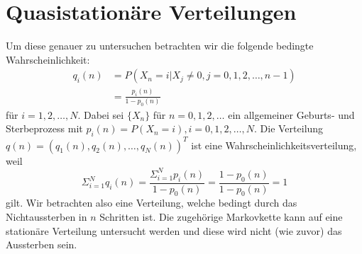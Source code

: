 \documentclass{article}
\begin{document}
\section{Quasistationäre Verteilungen}
Um diese genauer zu untersuchen betrachten wir die folgende bedingte Wahrscheinlichkeit:
\begin{align*}
  q_i(n) &= P(X_n=i|X_j \neq 0, j = 0,1,2,\dots,n-1) \\
         &= \frac{p_i(n)}{1-p_0(n)}
\end{align*}
für $i = 1,2,\dots, N$.
Dabei sei $\{X_n\}$ für $n = 0,1,2,\dots$  ein allgemeiner Geburts- und Sterbeprozess mit $p_i(n) = P(X_n = i), i = 0,1,2,\dots,N$. Die Verteilung $q(n) = (q_1(n), q_2(n), \dots, q_N(n))^T$ ist eine Wahrscheinlichkeitsverteilung, weil
\[
  Σ_{i=1}^N q_i(n) = \frac{Σ_{i=1}^Np_i(n)}{1-p_0(n)} = \frac{1-p_0(n)}{1-p_0(n)} = 1
\]
gilt. Wir betrachten also eine Verteilung, welche bedingt durch das Nichtaussterben in $n$ Schritten ist. Die zugehörige Markovkette kann auf eine stationäre Verteilung untersucht werden und diese wird nicht (wie zuvor) das Aussterben sein. 
\end{document}
